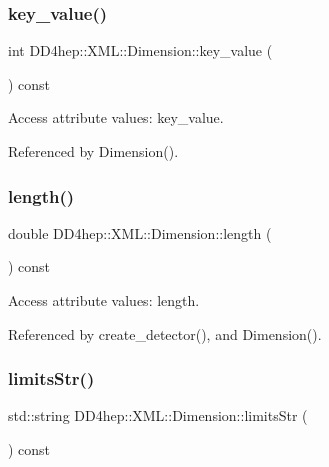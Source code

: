 \subsubsection{\texorpdfstring{key\+\_\+value()}{key\_value()}}
{\footnotesize\ttfamily int D\+D4hep\+::\+X\+M\+L\+::\+Dimension\+::key\+\_\+value (\begin{DoxyParamCaption}{ }\end{DoxyParamCaption}) const}



Access attribute values\+: key\+\_\+value. 



Referenced by Dimension().

\hypertarget{struct_d_d4hep_1_1_x_m_l_1_1_dimension_a6646f1da82102f21239fc662810bad3b}{}\label{struct_d_d4hep_1_1_x_m_l_1_1_dimension_a6646f1da82102f21239fc662810bad3b} 
\subsubsection{\texorpdfstring{length()}{length()}}
{\footnotesize\ttfamily double D\+D4hep\+::\+X\+M\+L\+::\+Dimension\+::length (\begin{DoxyParamCaption}{ }\end{DoxyParamCaption}) const}



Access attribute values\+: length. 



Referenced by create\+\_\+detector(), and Dimension().

\hypertarget{struct_d_d4hep_1_1_x_m_l_1_1_dimension_a605b896d69d735a72116fa7daba9b39f}{}\label{struct_d_d4hep_1_1_x_m_l_1_1_dimension_a605b896d69d735a72116fa7daba9b39f} 
\subsubsection{\texorpdfstring{limits\+Str()}{limitsStr()}}
{\footnotesize\ttfamily std\+::string D\+D4hep\+::\+X\+M\+L\+::\+Dimension\+::limits\+Str (\begin{DoxyParamCaption}{ }\end{DoxyParamCaption}) const}



